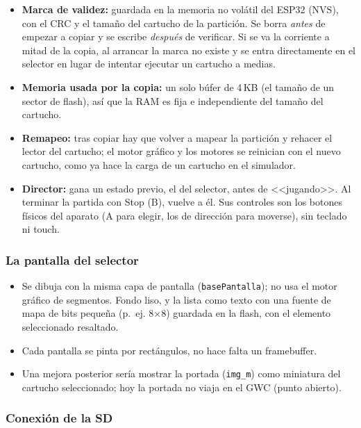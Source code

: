 \begin{itemize}
	\item \textbf{Marca de validez:} guardada en la memoria no volátil del ESP32 (NVS), con el CRC y el tamaño del cartucho de la partición. Se borra \emph{antes} de empezar a copiar y se escribe \emph{después} de verificar. Si se va la corriente a mitad de la copia, al arrancar la marca no existe y se entra directamente en el selector en lugar de intentar ejecutar un cartucho a medias.
	\item \textbf{Memoria usada por la copia:} un solo búfer de 4\,KB (el tamaño de un sector de flash), así que la RAM es fija e independiente del tamaño del cartucho.
	\item \textbf{Remapeo:} tras copiar hay que volver a mapear la partición y rehacer el lector del cartucho; el motor gráfico y los motores se reinician con el nuevo cartucho, como ya hace la carga de un cartucho en el simulador.
	\item \textbf{Director:} gana un estado previo, el del selector, antes de <<jugando>>. Al terminar la partida con Stop (B), vuelve a él. Sus controles son los botones físicos del aparato (A para elegir, los de dirección para moverse), sin teclado ni touch.
\end{itemize}

\subsubsection{La pantalla del selector}

\begin{itemize}
	\item Se dibuja con la misma capa de pantalla (\texttt{basePantalla}); no usa el motor gráfico de segmentos. Fondo liso, y la lista como texto con una fuente de mapa de bits pequeña (p.~ej. 8$\times$8) guardada en la flash, con el elemento seleccionado resaltado.
	\item Cada pantalla se pinta por rectángulos, no hace falta un framebuffer.
	\item Una mejora posterior sería mostrar la portada (\texttt{img\_m}) como miniatura del cartucho seleccionado; hoy la portada no viaja en el GWC (punto abierto).
\end{itemize}

\subsubsection{Conexión de la SD}

